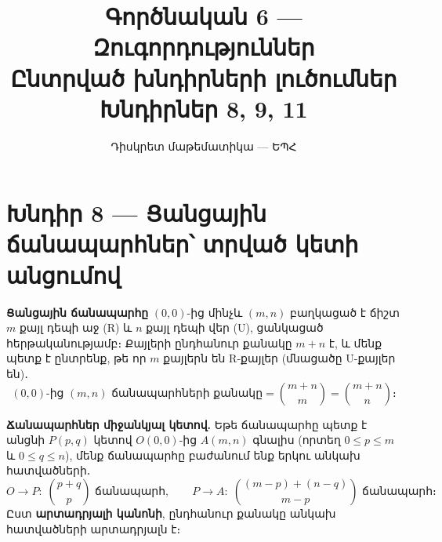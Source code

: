 \documentclass[12pt, a4paper]{article}
\title{\textbf{Գործնական 6 — Զուգորդություններ}\\[4pt]
       \large Ընտրված խնդիրների լուծումներ\\[2pt]
       \normalsize Խնդիրներ 8, 9, 11}
\author{Դիսկրետ մաթեմատիկա — ԵՊՀ}
\date{}
\begin{document}
\maketitle
\tableofcontents
\newpage

\section{Խնդիր 8 — Ցանցային ճանապարհներ՝ տրված կետի անցումով}

\begin{theorybox}
\textbf{Ցանցային ճանապարհը} $(0,0)$-ից մինչև $(m,n)$ բաղկացած է ճիշտ $m$ քայլ
դեպի աջ (R) և $n$ քայլ դեպի վեր (U), ցանկացած հերթականությամբ։
Քայլերի ընդհանուր քանակը $m + n$ է, և մենք պետք է ընտրենք, թե որ $m$ քայլերն են
R-քայլեր (մնացածը U-քայլեր են)․
\[
  (0,0)\text{-ից }(m,n)\text{ ճանապարհների քանակը}
  = \binom{m+n}{m} = \binom{m+n}{n} \text{։}
\]

\medskip
\textbf{Ճանապարհներ միջանկյալ կետով.}\;
Եթե ճանապարհը պետք է անցնի $P(p,q)$ կետով $O(0,0)$-ից $A(m,n)$ գնալիս
(որտեղ $0 \le p \le m$ և $0 \le q \le n$), մենք ճանապարհը բաժանում ենք
երկու անկախ հատվածների․
\[
  O \to P:\; \binom{p+q}{p} \text{ ճանապարհ},
  \qquad
  P \to A:\; \binom{(m-p)+(n-q)}{m-p} \text{ ճանապարհ։}
\]
Ըստ \textbf{արտադրյալի կանոնի}, ընդհանուր քանակը անկախ հատվածների արտադրյալն է։

\begin{center}
\end{center}

\begin{center}
\end{center}
\end{theorybox}
\end{document}
